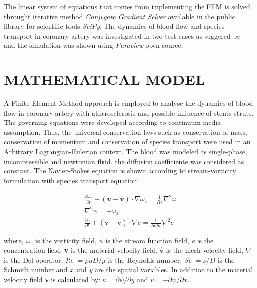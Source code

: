 \documentclass[10pt,fleqn,a4paper,twoside]{article}
\begin{document}
\smallskip
The linear system of equations that comes from implementing the FEM is solved throught iterative method \textit{Conjugate Gradient Solver} available in the public library for scientific tools \textit{SciPy}. 
The dynamics of blood flow and species transport in coronary artery was investigated in two test cases as suggered by \citet{wang2017} and
the simulation was shown using \textit{Paraview} open source.



\section{MATHEMATICAL MODEL}
A Finite Element Method approach is employed to analyse the dynamics of blood flow in coronary artery with atherosclerosis and possible influence of stents struts. 
The governing equations were developed according to continuum media assumption. Thus, the universal conservation laws such as conservation of mass, conservation of momentum and conservation of species transport were used in an Arbitrary Lagrangian-Eulerian context. 
The blood was modeled as single-phase, incompressible and newtonian fluid, the diffusion coefficiente was considered as constant. The Navier-Stokes equation is shown according to stream-vorticity formulation with species transport equation: 

\begin{align}
& \frac{\partial \omega_{z}}{\partial t} 
 + \left( \textbf{v} - \hat{\textbf{v}} \right) \cdot \nabla \omega_{z}
 =
 \frac{1}{Re} \nabla^{2} \omega_{z} \label{vorticidade}
 \\[10pt] 
& \nabla^{2} \psi
 = 
 - \omega_{z} \label{corrente} \\[10pt]
& \frac{\partial e}{\partial t} 
 + \left( \textbf{v} - \hat{\textbf{v}} \right) \cdot \nabla e
 =
 \frac{1}{ReSc} \nabla^{2} e \label{especie quimica}
\end{align}


\noindent
where, \textit{$\omega_{z}$} is the vorticity field,
\textit{$\psi$} is the stream function field,
\textit{e} is the concentration field,
\textbf{v} is the material velocity field,
$\hat{\textbf{v}}$ is the mesh velocity field,
$\nabla$ is the Del operator,
\textit{Re} $= \rho uD/\mu$ is the Reynolds number,
\textit{Sc} $= \nu / D$ is the Schmidt number and
\textit{x} and \textit{y} are the spatial variables.
In addition to the material velocity field \textbf{v} is calculated by:
$u = \partial \psi / \partial y$ and 
$v = - \partial \psi / \partial x$. 
\end{document}
